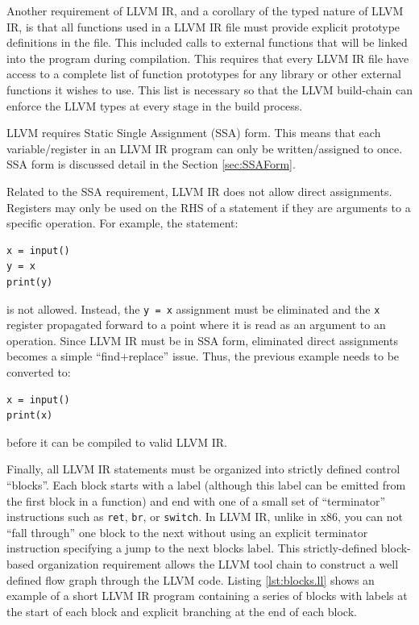 \documentclass[11pt,twocolumn]{article}
\begin{document}
Another requirement of LLVM IR, and a corollary of the typed nature of
LLVM IR, is that all functions used in a LLVM IR file must provide
explicit prototype definitions in the file. This included calls to
external functions that will be linked into the program during
compilation. This requires that every LLVM IR file have access to a
complete list of function prototypes for any library or other external
functions it wishes to use. This list is necessary so that the LLVM
build-chain can enforce the LLVM types at every stage in the build
process.

LLVM requires Static Single Assignment (SSA) form. This means that
each variable/register in an LLVM IR program can only be
written/assigned to once. SSA form is discussed detail in the Section
\ref{sec:SSAForm}.

Related to the SSA requirement, LLVM IR does not allow direct
assignments. Registers may only be used on the RHS of a statement if
they are arguments to a specific operation. For example, the statement:
\begin{verbatim}
x = input()
y = x
print(y)
\end{verbatim} 
is not allowed. Instead, the \texttt{y = x} assignment must be
eliminated and the \texttt{x} register propagated forward to a point
where it is read as an argument to an operation. Since LLVM IR must be
in SSA form, eliminated direct assignments becomes a simple
``find+replace'' issue. Thus, the previous example needs to be
converted to:
\begin{verbatim}
x = input()
print(x)
\end{verbatim}
before it can be compiled to valid LLVM IR.

Finally, all LLVM IR statements must be organized into strictly
defined control ``blocks''. Each block starts with a label (although
this label can be emitted from the first block in a function) and end
with one of a small set of ``terminator'' instructions such as
\texttt{ret}, \texttt{br}, or \texttt{switch}. In LLVM IR, unlike in
x86, you can not ``fall through'' one block to the next without using
an explicit terminator instruction specifying a jump to the next
blocks label. This strictly-defined block-based organization
requirement allows the LLVM tool chain to construct a well defined
flow graph through the LLVM code. Listing \ref{lst:blocks.ll} shows an
example of a short LLVM IR program containing a series of blocks with
labels at the start of each block and explicit branching at the end of
each block.
\end{document}
